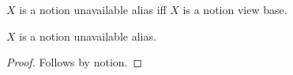 

\begin{abbreviation}\label{notion_proof_unavailable_alias}
    $X$ is a notion unavailable alias iff $X$ is a notion view base.
\end{abbreviation}

\begin{proposition}\label{notion_proof_unavailable}
    $X$ is a notion unavailable alias.
\end{proposition}
\begin{proof}
    Follows by notion.
\end{proof}
